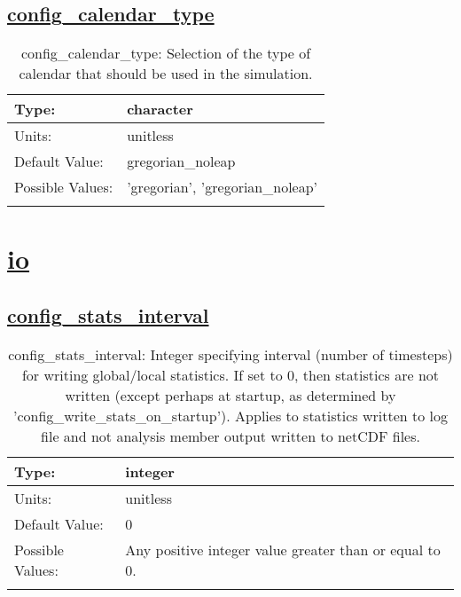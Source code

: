 \subsection[config\_calendar\_type]{\hyperref[sec:nm_tab_time_management]{config\_calendar\_type}}
\label{subsec:nm_sec_config_calendar_type}
\begin{center}
\begin{longtable}{| p{2.0in} || p{4.0in} |}
    \hline
    Type: & character \\
    \hline
    Units: & \si{unitless} \\
    \hline
    Default Value: & gregorian\_noleap \\
    \hline
    Possible Values: & 'gregorian', 'gregorian\_noleap' \\
    \hline
    \caption{config\_calendar\_type: Selection of the type of calendar that should be used in the simulation.}
\end{longtable}
\end{center}
\section[io]{\hyperref[sec:nm_tab_io]{io}}
\label{sec:nm_sec_io}
\subsection[config\_stats\_interval]{\hyperref[sec:nm_tab_io]{config\_stats\_interval}}
\label{subsec:nm_sec_config_stats_interval}
\begin{center}
\begin{longtable}{| p{2.0in} || p{4.0in} |}
    \hline
    Type: & integer \\
    \hline
    Units: & \si{unitless} \\
    \hline
    Default Value: & 0 \\
    \hline
    Possible Values: & Any positive integer value greater than or equal to 0. \\
    \hline
    \caption{config\_stats\_interval: Integer specifying interval (number of timesteps) for writing global/local statistics. If set to 0, then statistics are not written (except perhaps at startup, as determined by 'config\_write\_stats\_on\_startup'). Applies to statistics written to log file and not analysis member output written to netCDF files.}
\end{longtable}
\end{center}
